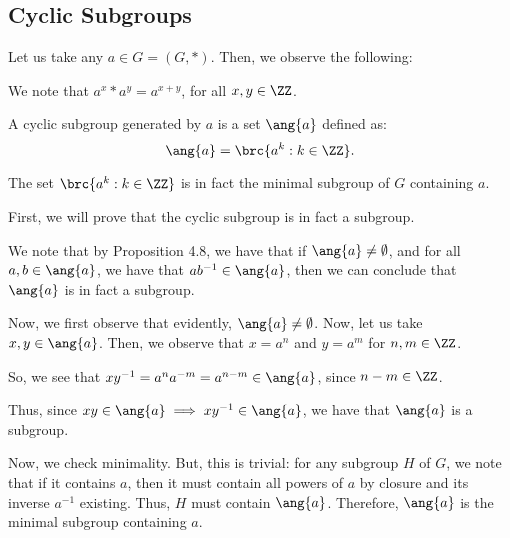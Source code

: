 \documentclass[openany]{book}
\begin{document}
\subsection{Cyclic Subgroups}
Let us take any $a \in G = (G, *)$. Then, we observe the following:
%		

\begin{lem}[Exponentiation]
	We note that $a^{x} * a^{y} = a^{x + y}$, for all $x,y \in \ZZ$.
\end{lem}

\begin{defn}
	A cyclic subgroup generated by $a$ is a set $\ang{a}$ defined as:
	\begin{equation*}
		\ang{a} = \brc{a^{k} : k \in \ZZ}.
	\end{equation*}
\end{defn}

\begin{thm}
	The set $\brc{a^{k} : k \in \ZZ}$ is in fact the minimal subgroup of $G$ containing $a$.
\end{thm}
\begin{solution}
	First, we will prove that the cyclic subgroup is in fact a subgroup.
	
	\begin{innerproof}
		We note that by Proposition 4.8, we have that if $\ang{a} \neq \emptyset$, and for all $a, b \in \ang{a}$, we have that $ab^{-1} \in \ang{a}$, then we can conclude that $\ang{a}$ is in fact a subgroup.
		
		Now, we first observe that evidently, $\ang{a} \neq \emptyset$. Now, let us take $x, y \in \ang{a}$. Then, we observe that $x = a^{n}$ and $y = a^{m}$ for $n, m \in \ZZ$.
		
		So, we see that $xy^{-1} = a^{n}a^{-m} = a^{n-m} \in \ang{a}$, since $n - m \in \ZZ$.
		
		Thus, since $xy \in \ang{a} \implies xy^{-1} \in \ang{a}$, we have that $\ang{a}$ is a subgroup.
	\end{innerproof}

	Now, we check minimality. But, this is trivial: for any subgroup $H$ of $G$, we note that if it contains $a$, then it must contain all powers of $a$ by closure and its inverse $a^{-1}$ existing. Thus, $H$ must contain $\ang{a}$. Therefore, $\ang{a}$ is the minimal subgroup containing $a$.
\end{solution}
\end{document}
